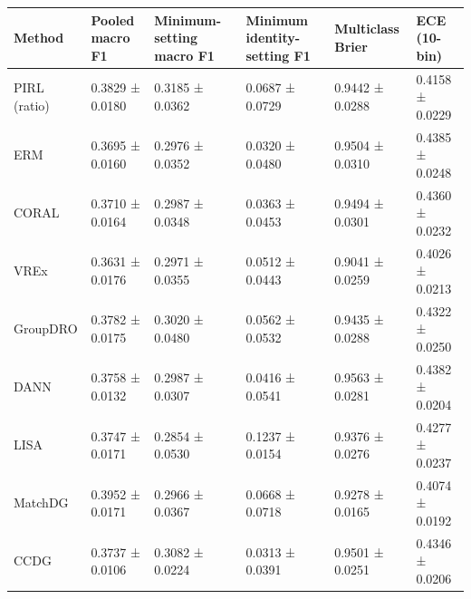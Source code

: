 \begin{tabular}{llllll}
\toprule
Method & Pooled macro F1 & Minimum-setting macro F1 & Minimum identity-setting F1 & Multiclass Brier & ECE (10-bin) \\
\midrule
PIRL (ratio) & 0.3829 ± 0.0180 & 0.3185 ± 0.0362 & 0.0687 ± 0.0729 & 0.9442 ± 0.0288 & 0.4158 ± 0.0229 \\
ERM & 0.3695 ± 0.0160 & 0.2976 ± 0.0352 & 0.0320 ± 0.0480 & 0.9504 ± 0.0310 & 0.4385 ± 0.0248 \\
CORAL & 0.3710 ± 0.0164 & 0.2987 ± 0.0348 & 0.0363 ± 0.0453 & 0.9494 ± 0.0301 & 0.4360 ± 0.0232 \\
VREx & 0.3631 ± 0.0176 & 0.2971 ± 0.0355 & 0.0512 ± 0.0443 & 0.9041 ± 0.0259 & 0.4026 ± 0.0213 \\
GroupDRO & 0.3782 ± 0.0175 & 0.3020 ± 0.0480 & 0.0562 ± 0.0532 & 0.9435 ± 0.0288 & 0.4322 ± 0.0250 \\
DANN & 0.3758 ± 0.0132 & 0.2987 ± 0.0307 & 0.0416 ± 0.0541 & 0.9563 ± 0.0281 & 0.4382 ± 0.0204 \\
LISA & 0.3747 ± 0.0171 & 0.2854 ± 0.0530 & 0.1237 ± 0.0154 & 0.9376 ± 0.0276 & 0.4277 ± 0.0237 \\
MatchDG & 0.3952 ± 0.0171 & 0.2966 ± 0.0367 & 0.0668 ± 0.0718 & 0.9278 ± 0.0165 & 0.4074 ± 0.0192 \\
CCDG & 0.3737 ± 0.0106 & 0.3082 ± 0.0224 & 0.0313 ± 0.0391 & 0.9501 ± 0.0251 & 0.4346 ± 0.0206 \\
\bottomrule
\end{tabular}

